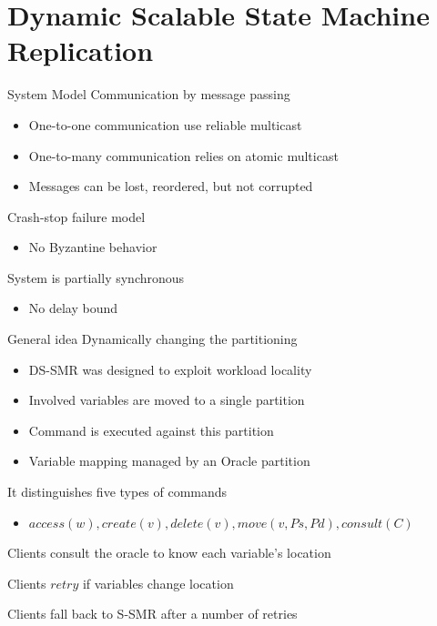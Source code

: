 \documentclass[10pt]{beamer}
\begin{document}
\section{Dynamic Scalable State Machine Replication}

\begin{frame}{System Model}
  Communication by message passing
  \begin{itemize}
    \item One-to-one communication use reliable multicast
    \item One-to-many communication relies on atomic multicast
    \item Messages can be lost, reordered, but not corrupted
  \end{itemize}
  Crash-stop failure model
  \begin{itemize}
    \item No Byzantine behavior
  \end{itemize}
  System is partially synchronous
  \begin{itemize}
    \item No delay bound
  \end{itemize}
\end{frame}

\begin{frame}{General idea}
  \alert {Dynamically changing the partitioning}
  \begin{itemize}
    \item DS-SMR was designed to exploit workload locality
    \item Involved variables are moved to a single partition
    \item Command is executed against this partition
    \item Variable mapping managed by an Oracle partition
  \end{itemize}

  It distinguishes five types of commands
  \begin{itemize}
    \item $access(w), create(v), delete(v), move(v, Ps, Pd), consult(C)$
  \end{itemize} 

  Clients consult the oracle to know each variable's location

  Clients $retry$ if variables change location

  Clients fall back to S-SMR after a number of retries

\end{frame}
\end{document}
